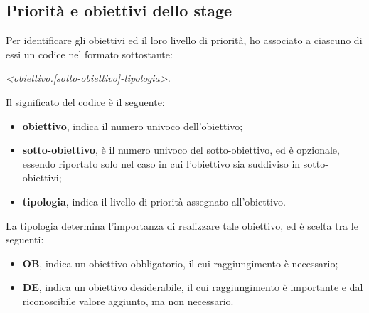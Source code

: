 \subsection{Priorità e obiettivi dello stage}
Per identificare gli obiettivi ed il loro livello di priorità, ho associato a ciascuno di essi un codice nel formato sottostante:
\\
\begin{center}
	\textit{<obiettivo.[sotto-obiettivo]-tipologia>. }
\end{center}

Il significato del codice è il seguente:
\begin{itemize}
\item \textbf{obiettivo}, indica il numero univoco dell'obiettivo;
\item \textbf{sotto-obiettivo}, è il numero univoco del sotto-obiettivo, ed è opzionale, essendo riportato solo nel caso in cui l'obiettivo sia suddiviso in sotto-obiettivi;
\item \textbf{tipologia}, indica il livello di priorità assegnato all'obiettivo.
\end{itemize}
La tipologia determina l'importanza di realizzare tale obiettivo, ed è scelta tra le seguenti:
\begin{itemize}
	\item \textbf{OB}, indica un obiettivo obbligatorio, il cui raggiungimento è necessario;
	\item \textbf{DE}, indica un obiettivo desiderabile, il cui raggiungimento è importante e dal riconoscibile valore aggiunto, ma non necessario.
\end{itemize}

\newpage

